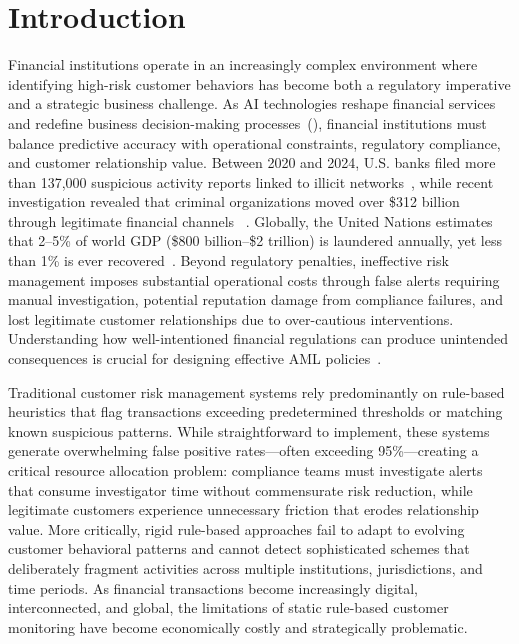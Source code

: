 \section{Introduction}
Financial institutions operate in an increasingly complex environment where identifying high-risk customer behaviors has become both a regulatory imperative and a strategic business challenge. As AI technologies reshape financial services and redefine business decision-making processes~(\cite{agrawal2019artificial}), financial institutions must balance predictive accuracy with operational constraints, regulatory compliance, and customer relationship value. Between 2020 and 2024, U.S. banks filed more than 137,000 suspicious activity reports linked to illicit networks~\parencite{website:FinCEN}, while recent investigation revealed that criminal organizations moved over \$312 billion through legitimate financial channels ~\parencite{website:WSJ}. Globally, the United Nations estimates that 2–5\% of world GDP (\$800 billion–\$2 trillion) is laundered annually, yet less than 1\% is ever recovered~\parencite{website:UN}. Beyond regulatory penalties, ineffective risk management imposes substantial operational costs through false alerts requiring manual investigation, potential reputation damage from compliance failures, and lost legitimate customer relationships due to over-cautious interventions. Understanding how well-intentioned financial regulations can produce unintended consequences is crucial for designing effective AML policies~\parencite{bao2017ni}.

Traditional customer risk management systems rely predominantly on rule-based heuristics that flag transactions exceeding predetermined thresholds or matching known suspicious patterns. While straightforward to implement, these systems generate overwhelming false positive rates—often exceeding 95\%—creating a critical resource allocation problem: compliance teams must investigate alerts that consume investigator time without commensurate risk reduction, while legitimate customers experience unnecessary friction that erodes relationship value. More critically, rigid rule-based approaches fail to adapt to evolving customer behavioral patterns and cannot detect sophisticated schemes that deliberately fragment activities across multiple institutions, jurisdictions, and time periods. As financial transactions become increasingly digital, interconnected, and global, the limitations of static rule-based customer monitoring have become economically costly and strategically problematic. 

